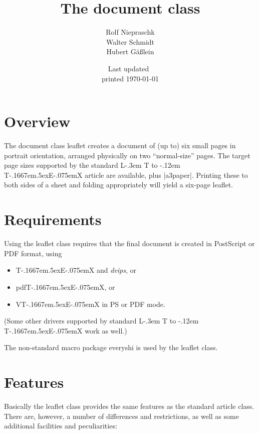 \documentclass[
]{leaflet}
\title{The document class \Lclass{leaflet}}
\author{%
  Rolf Niepraschk\\
  Walter Schmidt\\
  Hubert G\"a\ss lein}
\date{Last updated~\docdate\\printed \today}
\makeatletter
\def\ptmTeX{T\kern-.1667em\lower.5ex\hbox{E}\kern-.075emX\@}
\DeclareRobustCommand{\ptmLaTeX}{L\kern-.3em
        {\setbox0\hbox{T}%
         \vbox to\ht0{\hbox{%
                            \csname S@\f@size\endcsname
                            \fontsize\sf@size\z@
                            \math@fontsfalse\selectfont
                            A}%
                      \vss}%
        }%
        \kern-.12em
        \ptmTeX}
\let\TeX=\ptmTeX
\let\LaTeX=\ptmLaTeX
\newcommand\Lpack[1]{\textsf{#1}}
\newcommand\Lclass[1]{\textsf{#1}}
\newcommand\Lprog[1]{\textit{#1}}
\makeatother
\begin{document}


\maketitle
\thispagestyle{empty}



\section{Overview}

The document class \Lclass{leaflet} creates a document of (up to) six
small pages in portrait orientation, arranged physically on two
``normal-size'' pages. The target page sizes supported by the standard
\LaTeX{}  \Lclass{article} are available, plus |a3paper|. Printing these
to both sides of a sheet and folding appropriately will yield a six-page
leaflet.

\iffalse
\reversemarginpar
\marginpar[XXX]{YYY}
\fi
\onecolumn
\twocolumn[WWW]

\section{Requirements}

Using the \Lclass{leaflet} class requires that the final
document is created in PostScript or PDF format, using
\begin{itemize}
  \item \TeX{} and \Lprog{dvips}, or
  \item pdf\TeX{}, or
  \item V\TeX{} in PS or PDF mode.
\end{itemize}
(Some other drivers supported by standard \LaTeX{} work as well.)

The non-standard macro package \Lpack{everyshi} \cite{cit:everyshi} is
used by the \Lclass{leaflet} class.

\section{Features}

Basically the \Lclass{leaflet} class provides the same features as the
standard \Lclass{article} class. There are, however, a number of
differences and restrictions, as well as some additional facilities and
peculiarities:
\end{document}
